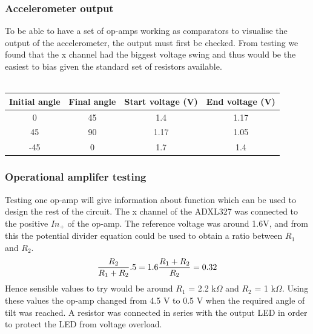 \documentclass[12pt]{article}
\begin{document}
            \subsubsection{Accelerometer output}
            To be able to have a set of op-amps working as comparators to visualise the output of the accelerometer, the output must first be checked. From testing
            we found that the x channel had the biggest voltage swing and thus would be the easiest to bias given the standard set of resistors available. \\ \\
            \begin{tabular}{ |c|c|c|c| }
                \hline
                Initial angle & Final angle & Start voltage (V) & End voltage (V) \\
                \hline
                0 & 45 & 1.4 & 1.17 \\
                \hline
                45 & 90 & 1.17 & 1.05 \\
                \hline
                -45 & 0 & 1.7 & 1.4 \\
                \hline
            \end{tabular}
            \subsubsection{Operational amplifer testing}
                Testing one op-amp will give information about function which can be used to design the rest of the circuit. The x channel of the ADXL327 was connected
                to the positive $In_+$ of the op-amp. The reference voltage was around 1.6V, and from this the potential divider equation could be used to obtain a ratio between
                $R_1$ and $R_2$. 
                \begin{equation}
                    \frac{R_2}{R_1+R_2}.5 = 1.6 \\
                    \frac{R_1+R_2}{R_2} = 0.32 \\
                \end{equation}
                Hence sensible values to try would be around $R_1$ = 2.2 k$\Omega$ and $R_2$ = 1 k$\Omega$. Using these values the op-amp changed from 4.5 V to 0.5 V when the
                required angle of tilt was reached. A resistor was connected in series with the output LED in order to protect the LED from voltage overload. 
\end{document}
